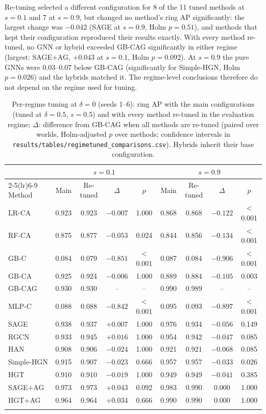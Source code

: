 \documentclass[pdflatex,sn-vancouver-num]{sn-jnl}
\begin{document}
Re-tuning selected a different configuration for 8 of the 11 tuned methods at $s=0.1$ and 7 at $s=0.9$, but
changed no method's ring AP significantly: the largest change was $-0.042$ (SAGE at $s=0.9$, Holm $p=0.51$), and
methods that kept their configuration reproduced their results exactly. With every method re-tuned, no GNN or
hybrid exceeded GB-CAG significantly in either regime (largest: SAGE+AG, $+0.043$ at $s=0.1$, Holm $p=0.092$). At
$s=0.9$ the pure GNNs were 0.03--0.07 below GB-CAG (significantly for Simple-HGN, Holm $p=0.026$) and the hybrids
matched it. The regime-level conclusions therefore do not depend on the regime used for tuning.

\begin{table}[h]
\caption{Per-regime tuning at $\delta=0$ (seeds 1--6): ring AP with the main configurations (tuned at $\delta=0.5$, $s=0.5$) and with every method re-tuned in the evaluation regime; $\Delta$: difference from GB-CAG when all methods are re-tuned (paired over worlds, Holm-adjusted $p$ over methods; confidence intervals in \texttt{results/tables/regimetuned\_comparisons.csv}). Hybrids inherit their base configuration.}\label{tab:regimetuned}
\scriptsize
\setlength{\tabcolsep}{4pt}
\begin{tabular}{@{}lcccccccc@{}}
\toprule
 & \multicolumn{4}{c}{$s=0.1$} & \multicolumn{4}{c}{$s=0.9$} \\
\cmidrule(lr){2-5}\cmidrule(lr){6-9}
Method & Main & Re-tuned & $\Delta$ & $p$ & Main & Re-tuned & $\Delta$ & $p$ \\
\midrule
LR-CA & 0.923 & 0.923 & $-0.007$ & 1.000 & 0.868 & 0.868 & $-0.122$ & $<$0.001 \\
RF-CA & 0.875 & 0.877 & $-0.053$ & 0.024 & 0.844 & 0.856 & $-0.134$ & $<$0.001 \\
GB-C & 0.084 & 0.079 & $-0.851$ & $<$0.001 & 0.087 & 0.084 & $-0.906$ & $<$0.001 \\
GB-CA & 0.925 & 0.924 & $-0.006$ & 1.000 & 0.889 & 0.884 & $-0.105$ & 0.003 \\
GB-CAG & 0.930 & 0.930 & -- & -- & 0.990 & 0.989 & -- & -- \\
MLP-C & 0.088 & 0.088 & $-0.842$ & $<$0.001 & 0.095 & 0.093 & $-0.897$ & $<$0.001 \\
SAGE & 0.938 & 0.937 & $+0.007$ & 1.000 & 0.976 & 0.934 & $-0.056$ & 0.149 \\
RGCN & 0.933 & 0.945 & $+0.016$ & 1.000 & 0.954 & 0.942 & $-0.047$ & 0.085 \\
HAN & 0.908 & 0.906 & $-0.024$ & 1.000 & 0.921 & 0.921 & $-0.068$ & 0.085 \\
Simple-HGN & 0.915 & 0.907 & $-0.023$ & 0.666 & 0.957 & 0.957 & $-0.033$ & 0.026 \\
HGT & 0.910 & 0.910 & $-0.019$ & 1.000 & 0.949 & 0.949 & $-0.041$ & 0.385 \\
SAGE+AG & 0.973 & 0.973 & $+0.043$ & 0.092 & 0.983 & 0.990 & $0.000$ & 1.000 \\
HGT+AG & 0.964 & 0.964 & $+0.034$ & 0.666 & 0.990 & 0.990 & $0.000$ & 1.000 \\
\botrule
\end{tabular}
\end{table}
\end{document}
